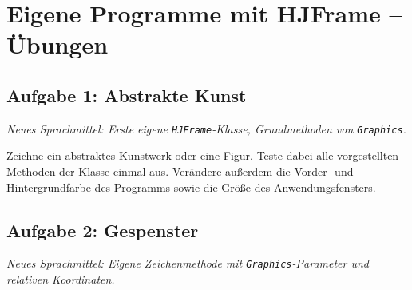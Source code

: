 \clearpage

\rehead[]{\textcolor{lightblue}{AvHG, Inf, My}}
\lohead[]{\textcolor{lightblue}{AvHG, Inf, My}}

\section{Eigene Programme mit HJFrame -- Übungen}

\subsection{Aufgabe 1: Abstrakte Kunst \tagZusatz}
\noindent \emph{Neues Sprachmittel: Erste eigene \texttt{HJFrame}-Klasse, Grundmethoden von \texttt{Graphics}.}

Zeichne ein abstraktes Kunstwerk oder eine Figur. Teste dabei alle
vorgestellten Methoden der Klasse  einmal aus. Verändere
außerdem die Vorder- und Hintergrundfarbe des Programms sowie die Größe des
Anwendungsfensters.


\subsection{Aufgabe 2: Gespenster \tagPflicht}
\noindent \emph{Neues Sprachmittel: Eigene Zeichenmethode mit \texttt{Graphics}-Parameter und relativen Koordinaten.}

